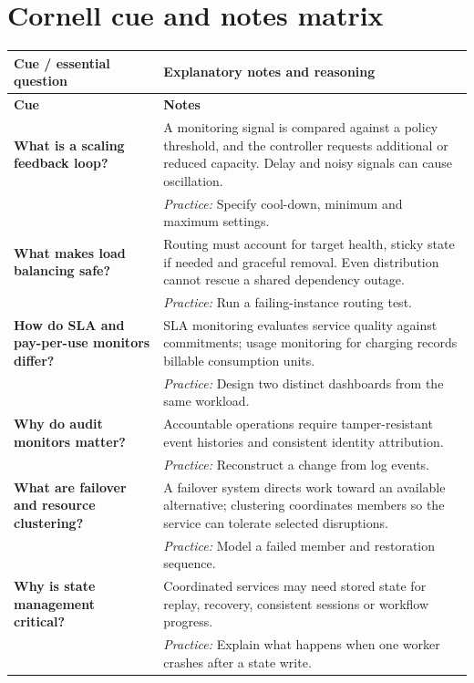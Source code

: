\documentclass[10pt,letterpaper]{article}
\begin{document}
\section{Cornell cue and notes matrix}
\small\setlength{\LTleft}{0pt}\setlength{\LTright}{0pt plus 1fill}
\begin{longtable}{>{\RaggedRight\arraybackslash}p{}>{\RaggedRight\arraybackslash}p{}}
\toprule\textbf{Cue / essential question}&\textbf{Explanatory notes and reasoning}\\\midrule\endfirsthead\toprule\textbf{Cue}&\textbf{Notes}\\\midrule\endhead
\textbf{What is a scaling feedback loop?} & A monitoring signal is compared against a policy threshold, and the controller requests additional or reduced capacity. Delay and noisy signals can cause oscillation.\\[3pt]& \textcolor{petrol}{\emph{Practice:} Specify cool-down, minimum and maximum settings.}\\[8pt]\midrule
\textbf{What makes load balancing safe?} & Routing must account for target health, sticky state if needed and graceful removal. Even distribution cannot rescue a shared dependency outage.\\[3pt]& \textcolor{petrol}{\emph{Practice:} Run a failing-instance routing test.}\\[8pt]\midrule
\textbf{How do SLA and pay-per-use monitors differ?} & SLA monitoring evaluates service quality against commitments; usage monitoring for charging records billable consumption units.\\[3pt]& \textcolor{petrol}{\emph{Practice:} Design two distinct dashboards from the same workload.}\\[8pt]\midrule
\textbf{Why do audit monitors matter?} & Accountable operations require tamper-resistant event histories and consistent identity attribution.\\[3pt]& \textcolor{petrol}{\emph{Practice:} Reconstruct a change from log events.}\\[8pt]\midrule
\textbf{What are failover and resource clustering?} & A failover system directs work toward an available alternative; clustering coordinates members so the service can tolerate selected disruptions.\\[3pt]& \textcolor{petrol}{\emph{Practice:} Model a failed member and restoration sequence.}\\[8pt]\midrule
\textbf{Why is state management critical?} & Coordinated services may need stored state for replay, recovery, consistent sessions or workflow progress.\\[3pt]& \textcolor{petrol}{\emph{Practice:} Explain what happens when one worker crashes after a state write.}\\[8pt]\midrule
\end{longtable}\normalsize
\end{document}

